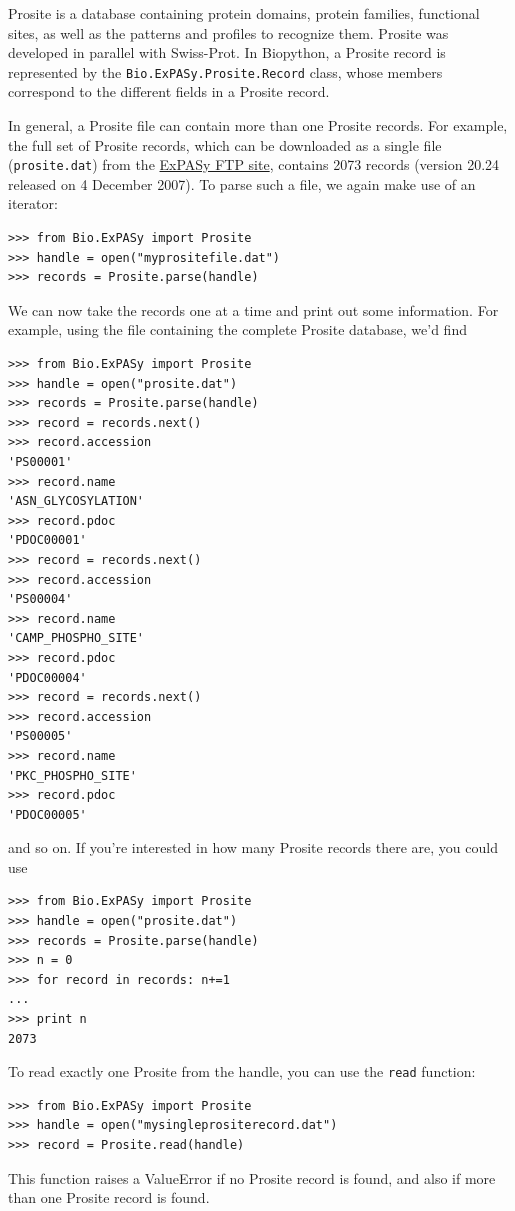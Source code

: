 \documentclass{report}
\begin{document}
Prosite is a database containing protein domains, protein families, functional sites, as well as the patterns and profiles to recognize them. Prosite was developed in parallel with Swiss-Prot. In Biopython, a Prosite record is represented by the \verb|Bio.ExPASy.Prosite.Record| class, whose members correspond to the different fields in a Prosite record.

In general, a Prosite file can contain more than one Prosite records. For example, the full set of Prosite records, which can be downloaded as a single file (\verb|prosite.dat|) from the \href{ftp://ftp.expasy.org/databases/prosite/prosite.dat}{ExPASy FTP site}, contains 2073 records (version 20.24 released on 4 December 2007). To parse such a file, we again make use of an iterator:

\begin{verbatim}
>>> from Bio.ExPASy import Prosite
>>> handle = open("myprositefile.dat")
>>> records = Prosite.parse(handle)
\end{verbatim}

We can now take the records one at a time and print out some information. For example, using the file containing the complete Prosite database, we'd find
\begin{verbatim}
>>> from Bio.ExPASy import Prosite
>>> handle = open("prosite.dat")
>>> records = Prosite.parse(handle)
>>> record = records.next()
>>> record.accession
'PS00001'
>>> record.name
'ASN_GLYCOSYLATION'
>>> record.pdoc
'PDOC00001'
>>> record = records.next()
>>> record.accession
'PS00004'
>>> record.name
'CAMP_PHOSPHO_SITE'
>>> record.pdoc
'PDOC00004'
>>> record = records.next()
>>> record.accession
'PS00005'
>>> record.name
'PKC_PHOSPHO_SITE'
>>> record.pdoc
'PDOC00005'
\end{verbatim}
and so on. If you're interested in how many Prosite records there are, you could use
\begin{verbatim}
>>> from Bio.ExPASy import Prosite
>>> handle = open("prosite.dat")
>>> records = Prosite.parse(handle)
>>> n = 0
>>> for record in records: n+=1
...
>>> print n
2073
\end{verbatim}

To read exactly one Prosite from the handle, you can use the \verb|read| function:
\begin{verbatim}
>>> from Bio.ExPASy import Prosite
>>> handle = open("mysingleprositerecord.dat")
>>> record = Prosite.read(handle)
\end{verbatim}
This function raises a ValueError if no Prosite record is found, and also if more than one Prosite record is found.
\end{document}
